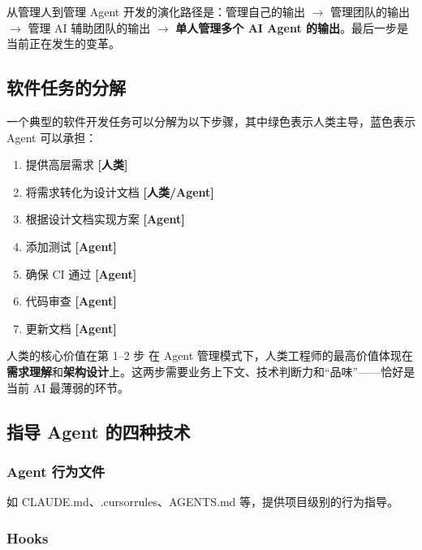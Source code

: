 \documentclass[a4paper]{article}
\begin{document}
\begin{importantbox}{从管理人到管理 Agent}
开发的演化路径是：管理自己的输出 $\rightarrow$ 管理团队的输出 $\rightarrow$ 管理 AI 辅助团队的输出 $\rightarrow$ \textbf{单人管理多个 AI Agent 的输出}。最后一步是当前正在发生的变革。
\end{importantbox}

\subsection{软件任务的分解}

一个典型的软件开发任务可以分解为以下步骤，其中绿色表示人类主导，蓝色表示 Agent 可以承担：

\begin{enumerate}
    \item 提供高层需求 \textbf{{[}人类{]}}
    \item 将需求转化为设计文档 \textbf{{[}人类/Agent{]}}
    \item 根据设计文档实现方案 \textbf{{[}Agent{]}}
    \item 添加测试 \textbf{{[}Agent{]}}
    \item 确保 CI 通过 \textbf{{[}Agent{]}}
    \item 代码审查 \textbf{{[}Agent{]}}
    \item 更新文档 \textbf{{[}Agent{]}}
\end{enumerate}

\begin{knowledgebox}{人类的核心价值在第 1--2 步}
在 Agent 管理模式下，人类工程师的最高价值体现在\textbf{需求理解}和\textbf{架构设计}上。这两步需要业务上下文、技术判断力和``品味''——恰好是当前 AI 最薄弱的环节。
\end{knowledgebox}

\subsection{指导 Agent 的四种技术}

\subsubsection{Agent 行为文件}

如 CLAUDE.md、.cursorrules、AGENTS.md 等，提供项目级别的行为指导。

\subsubsection{Hooks}
\end{document}
